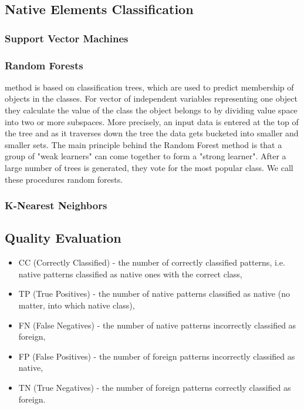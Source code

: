 \documentclass{llncs}
\begin{document}
\subsection{Native Elements Classification}


\subsubsection{Support Vector Machines}
\subsubsection{Random Forests}
method is based on classification trees, which are used to predict membership of objects in the classes.
For vector of independent variables representing one object they calculate the value of the class the object belongs to by dividing value space into two or more subspaces. More precisely, an input data is entered at the top of the tree and as it traverses down the tree the data gets bucketed into smaller and smaller sets.
The main principle behind the Random Forest method is that a group of "weak learners" can come together to form a "strong learner". 
After a large number of trees is generated, they vote for the most popular class.
We call these procedures random forests.
\subsubsection{K-Nearest Neighbors}

\subsection{Quality Evaluation}

\begin{itemize}
\item CC  (Correctly Classified) - the number of correctly classified patterns, i.e. native patterns classified as native ones with the correct class, %
\item TP  (True Positives) - the number of native patterns classified as native (no matter, into which native class),
\item FN  (False Negatives) - the number of native patterns incorrectly classified as foreign,
\item FP  (False Positives) - the number of foreign patterns incorrectly classified as native,
\item TN  (True Negatives) - the number of foreign patterns correctly classified as foreign.
\end{itemize}
\end{document}
